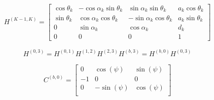 \begin{equation}
H^{(K-1,K)} =
\begin{bmatrix}
\cos\theta_k &-\cos\alpha_k\sin\theta_k &\sin\alpha_k\sin\theta_k &a_k\cos\theta_k\\
\sin\theta_k &\cos\alpha_k\cos\theta_k &-\sin\alpha_k\cos\theta_k &a_k\sin\theta_k\\
0 &\sin\alpha_k &\cos\alpha_k &d_k \\ 
0 &0 &0 &1
\end{bmatrix}
\end{equation}

\begin{align*}
H^{(0,3)} = H^{(0,1)} H^{(1,2)} H^{(2,3)} H^{(b,3)}= H^{(b,0)} H^{(0,3)}
\end{align*}

\begin{center}
	
	\[
	C^{(b,0)}=
	\begin{bmatrix}
	0 & \cos(\psi) & \sin(\psi) \\
	-1&		0	   & 		0 	\\
	0 & -\sin(\psi)& \cos(\psi) \\

	\end{bmatrix}
	\]
\end{center}

